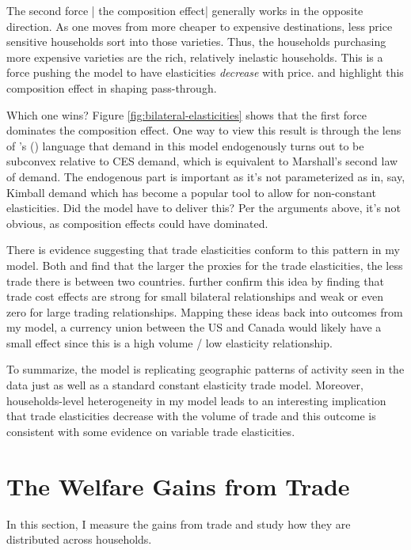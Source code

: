 \documentclass[12pt,pdftex]{article}
\def\citeapos#1{\citeauthor{#1}'s (\citeyear{#1})}
\begin{document}
\begin{onehalfspacing}
The second force | the composition effect| generally works in the opposite direction. As one moves from more cheaper to expensive destinations, less price sensitive households sort into those varieties. Thus, the households purchasing more expensive varieties are the rich, relatively inelastic households. This is a force pushing the model to have elasticities \emph{decrease} with price. \citet{nakamura2010accounting} and \citet*{head2021poor} highlight this composition effect in shaping pass-through.

Which one wins? Figure \ref{fig:bilateral-elasticities} shows that the first force dominates the composition effect. One way to view this result is through the lens of \citeapos{mrazova2017not} language that demand in this model endogenously turns out to be subconvex relative to CES demand, which is equivalent to Marshall's second law of demand. The endogenous part is important as it's not parameterized as in, say, Kimball demand which has become a popular tool to allow for non-constant elasticities. Did the model have to deliver this? Per the arguments above, it's not obvious, as composition effects could have dominated.

There is evidence suggesting that trade elasticities conform to this pattern in my model. Both \citet{novy2013international} and \citet{carrere2020gravity} find that the larger the proxies for the trade elasticities, the less trade there is between two countries. \citet{chen2022gravity} further confirm this idea by finding that trade cost effects are strong for small bilateral relationships and weak or even zero for large trading relationships. Mapping these ideas back into outcomes from my model, a currency union between the US and Canada would likely have a small effect since this is a high volume / low elasticity relationship.

To summarize, the model is replicating geographic patterns of activity seen in the data just as well as a standard constant elasticity trade model. Moreover, households-level heterogeneity in my model leads to an interesting implication that trade elasticities decrease with the volume of trade and this outcome is consistent with some evidence on variable trade elasticities.

\section{The Welfare Gains from Trade}

In this section, I measure the gains from trade and study how they are distributed across households.


\end{onehalfspacing}
\end{document}
